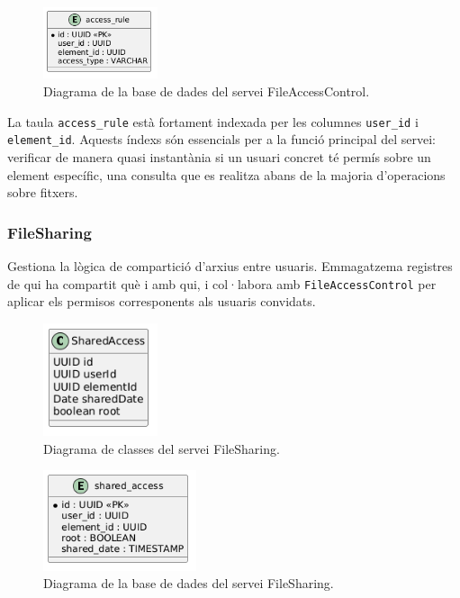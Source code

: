 \begin{figure}[H]
\centering
    \includegraphics[width=0.3\textwidth]{Figures/diagrama_bd_fileAccesControl.png}
    \caption{Diagrama de la base de dades del servei FileAccessControl.}
    \label{fig:fac_db}
\end{figure}

La taula \texttt{access\_rule} està fortament indexada per les columnes \texttt{user\_id} i \texttt{element\_id}. Aquests índexs són essencials per a la funció principal del servei: verificar de manera quasi instantània si un usuari concret té permís sobre un element específic, una consulta que es realitza abans de la majoria d'operacions sobre fitxers.

\subsubsection{FileSharing}
Gestiona la lògica de compartició d'arxius entre usuaris. Emmagatzema registres de qui ha compartit què i amb qui, i col·labora amb \texttt{FileAccessControl} per aplicar els permisos corresponents als usuaris convidats.

\begin{figure}[H]
    \centering
    \includegraphics[width=0.3\textwidth]{Figures/diagrama_clases_fileSharing.png}
    \caption{Diagrama de classes del servei FileSharing.}
    \label{fig:filesharing_classes}
\end{figure}

\begin{figure}[H]
    \centering
    \includegraphics[width=0.4\textwidth]{Figures/diagrama_bd_fileSharing.png}
    \caption{Diagrama de la base de dades del servei FileSharing.}
    \label{fig:filesharing_db}
\end{figure}

